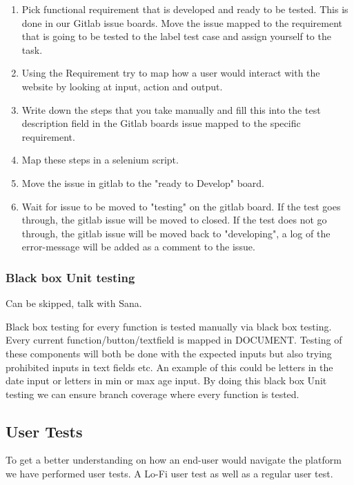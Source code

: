\begin{enumerate}
    \item Pick functional requirement that is developed and ready to be tested. This is done in our Gitlab issue boards. Move the issue mapped to the requirement that is going to be tested to the label test case and assign yourself to the task.
    \item Using the Requirement try to map how a user would interact with the website by looking at input, action and output. 
    \item Write down the steps that you take manually and fill this into the test description field in the Gitlab boards issue mapped to the specific requirement.
    \item Map these steps in a selenium script.
    \item Move the issue in gitlab to the "ready to Develop" board.
    \item Wait for issue to be moved to "testing" on the gitlab board.
    \subitem If the test goes through, the gitlab issue will be moved to closed.
    \subitem If the test does not go through, the gitlab issue will be moved back to "developing", a log of the error-message will be added as a comment to the issue. 
\end{enumerate}




\subsubsection{Black box Unit testing}
Can be skipped, talk with Sana.

Black box testing for every function is tested manually via black box testing. Every current function/button/textfield is mapped in DOCUMENT. Testing of these components will both be done with the expected inputs but also trying prohibited inputs in text fields etc. An example of this could be letters in the date input or letters in min or max age input. By doing this black box Unit testing we can ensure branch coverage where every function is tested. 


\subsection{User Tests}
To get a better understanding on how an end-user would navigate the platform we have performed user tests. A Lo-Fi user test as well as a regular user test.


